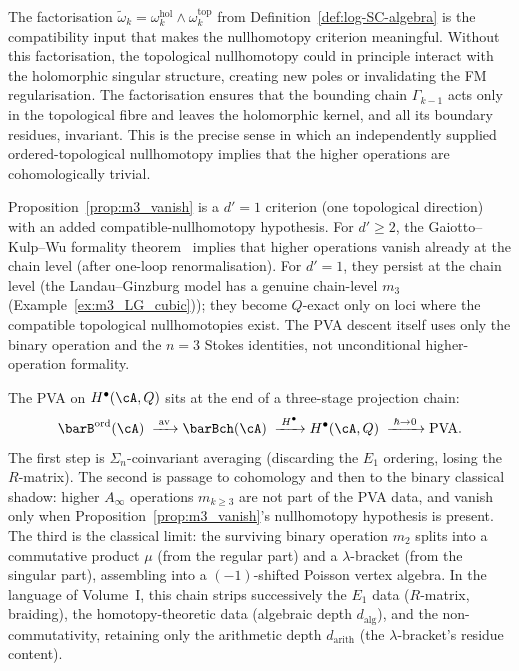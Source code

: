 \begin{remark}
\label{rem:factorisation-role}
The factorisation
$\widetilde\omega_k = \omega_k^{\mathrm{hol}}\wedge\omega_k^{\mathrm{top}}$
from Definition~\ref{def:log-SC-algebra} is the compatibility input
that makes the nullhomotopy criterion meaningful. Without
this factorisation, the topological nullhomotopy
could in principle interact with the holomorphic singular structure, creating new
poles or invalidating the FM regularisation. The factorisation ensures that
the bounding chain $\Gamma_{k-1}$ acts only in the topological fibre and leaves the
holomorphic kernel, and all its boundary residues, invariant. This is the
precise sense in which an independently supplied ordered-topological
nullhomotopy implies that the higher operations are cohomologically
trivial.
\end{remark}

\begin{remark}[The role of $d'=1$]
\label{rem:d-prime-role}
Proposition~\ref{prop:m3_vanish} is a $d'=1$ criterion (one
topological direction) with an added compatible-nullhomotopy
hypothesis.
For $d'\ge2$, the Gaiotto--Kulp--Wu formality theorem~\cite{GKW25} implies that
higher operations vanish already at the chain level (after one-loop renormalisation).
For $d'=1$, they persist at the chain level (the Landau--Ginzburg model has a
genuine chain-level $m_3$ (Example~\ref{ex:m3_LG_cubic})); they
become $Q$-exact only on loci where the compatible topological
nullhomotopies exist. The PVA descent itself uses only the binary
operation and the $n=3$ Stokes identities, not unconditional
higher-operation formality.
\end{remark}

\begin{remark}
\label{rem:pva-classical-projection}%
%
%
The PVA on $H^\bullet(\cA, Q)$ sits at the end of a three-stage
projection chain:
\[
\barB^{\mathrm{ord}}(\cA)
\;\xrightarrow{\;\mathrm{av}\;}
\barBch(\cA)
\;\xrightarrow{\;H^\bullet\;}
H^\bullet(\cA,Q)
\;\xrightarrow{\;\hbar \to 0\;}
\text{PVA}.
\]
The first step is $\Sigma_n$-coinvariant averaging (discarding the
$E_1$ ordering, losing the $R$-matrix). The second is passage to
cohomology and then to the binary classical shadow: higher
$A_\infty$ operations $m_{k \ge 3}$ are not part of the PVA data,
and vanish only when Proposition~\ref{prop:m3_vanish}'s
nullhomotopy hypothesis is present. The third
is the classical limit: the surviving binary operation $m_2$ splits
into a commutative product $\mu$ (from the regular part) and a
$\lambda$-bracket (from the singular part), assembling into a
$(-1)$-shifted Poisson vertex algebra. In the language of Volume~I,
this chain strips successively the $E_1$ data ($R$-matrix, braiding),
the homotopy-theoretic data (algebraic depth $d_{\mathrm{alg}}$),
and the non-commutativity, retaining only the arithmetic depth
$d_{\mathrm{arith}}$ (the $\lambda$-bracket's residue content).
\end{remark}

